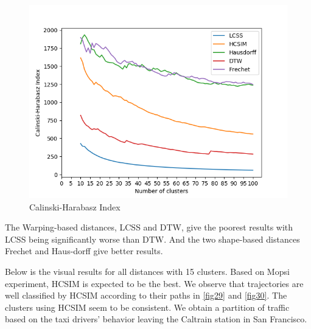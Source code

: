 \documentclass[a4paper, 12pt]{article}
\begin{document}
\begin{figure}[ht]
    \centering
    \includegraphics[width=1\textwidth]{calinski harabasz.png}
    \caption{Calinski-Harabasz Index}
    \label{fig34}
\end{figure}

\pagebreak

The Warping-based distances, LCSS and DTW, give the poorest results with LCSS being significantly worse than DTW. And the two shape-based distances Frechet and Haus-dorff give better results.

Below is the visual results for all distances with 15 clusters. Based on Mopsi experiment, HCSIM is expected to be the best. We observe that trajectories are well classified by HCSIM according to their paths in \ref{fig29} and \ref{fig30}. The clusters using HCSIM seem to be consistent. We obtain a partition of traffic based on the taxi drivers’ behavior leaving the Caltrain station in San Francisco.
\end{document}
